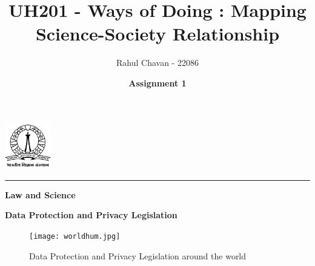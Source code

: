\documentclass{report}
\title{\textbf{UH201 - Ways of Doing : Mapping Science-Society Relationship}}
\author{Rahul Chavan - 22086}
\date{\textbf{Assignment 1}}
\renewcommand{\maketitle}{
 \begin{center}
    \includegraphics[width=2cm]{IISc_Master_Seal_Black.jpg}
    \vspace{0.5cm}

    \Large
    \textbf{\thetitle}
    
    \vspace{0.5cm}
    
    \Large
    \theauthor
    
    \vspace{0.2cm}
    
    \large
    \thedate

    \vspace{0.5cm}

    \hrule  
    
  \end{center}
}
\begin{document}
\maketitle
\begin{center}
    \Large
    \textbf{Law and Science}
\end{center} 

\begin{center}
  \large
  \textbf{Data Protection and Privacy Legislation}
\end{center}

\begin{figure}[!ht] 
  \centering 
  \texttt{[image: worldhum.jpg]} 
  \caption{Data Protection and Privacy Legislation around the world}
  \label{fig: Linear fitting} 
\end{figure}
\end{document}
